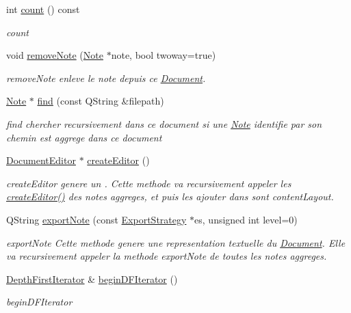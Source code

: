 \begin{DoxyCompactItemize}
int \hyperlink{class_document_a41a8d65d5681a20469d5d0210171a6b8}{count} () const 
\begin{DoxyCompactList}\small\item\em count \end{DoxyCompactList}\item 
void \hyperlink{class_document_a306185118351991a24f14453e3a9d6ca}{remove\-Note} (\hyperlink{class_note}{Note} $\ast$note, bool twoway=true)
\begin{DoxyCompactList}\small\item\em remove\-Note enleve le note depuis ce \hyperlink{class_document}{Document}. \end{DoxyCompactList}\item 
\hyperlink{class_note}{Note} $\ast$ \hyperlink{class_document_ad6a4b9f4fe2d17cf458a303c397a2980}{find} (const Q\-String \&filepath)
\begin{DoxyCompactList}\small\item\em find chercher recursivement dans ce document si une \hyperlink{class_note}{Note} identifie par son chemin est aggrege dans ce document \end{DoxyCompactList}\item 
\hyperlink{class_document_editor}{Document\-Editor} $\ast$ \hyperlink{class_document_adef0577eba2c367b4e4b8ca322a15e88}{create\-Editor} ()
\begin{DoxyCompactList}\small\item\em create\-Editor genere un . Cette methode va recursivement appeler les \hyperlink{class_document_adef0577eba2c367b4e4b8ca322a15e88}{create\-Editor()} des notes aggreges, et puis les ajouter dans sont content\-Layout. \end{DoxyCompactList}\item 
Q\-String \hyperlink{class_document_aa86a140e1a2841e983fd542230cbae2f}{export\-Note} (const \hyperlink{class_export_strategy}{Export\-Strategy} $\ast$es, unsigned int level=0)
\begin{DoxyCompactList}\small\item\em export\-Note Cette methode genere une representation textuelle du \hyperlink{class_document}{Document}. Elle va recursivement appeler la methode export\-Note de toutes les notes aggreges. \end{DoxyCompactList}\item 
\hyperlink{class_document_1_1_depth_first_iterator}{Depth\-First\-Iterator} \& \hyperlink{class_document_afc21209fe492ef052393ea7aec85048b}{begin\-D\-F\-Iterator} ()
\begin{DoxyCompactList}\small\item\em begin\-D\-F\-Iterator \end{DoxyCompactList}\end{DoxyCompactItemize}
